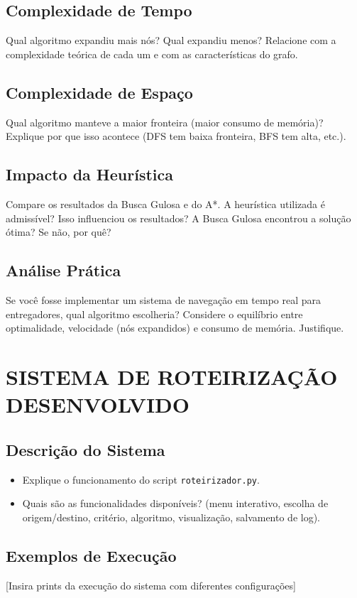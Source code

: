 \documentclass[12pt,a4paper]{article}
\begin{document}
\subsection{Complexidade de Tempo}
Qual algoritmo expandiu mais nós? Qual expandiu menos? Relacione com a complexidade teórica de cada um e com as características do grafo.

\subsection{Complexidade de Espaço}
Qual algoritmo manteve a maior fronteira (maior consumo de memória)? Explique por que isso acontece (DFS tem baixa fronteira, BFS tem alta, etc.).

\subsection{Impacto da Heurística}
Compare os resultados da Busca Gulosa e do A*. A heurística utilizada é admissível? Isso influenciou os resultados? A Busca Gulosa encontrou a solução ótima? Se não, por quê?

\subsection{Análise Prática}
Se você fosse implementar um sistema de navegação em tempo real para entregadores, qual algoritmo escolheria? Considere o equilíbrio entre optimalidade, velocidade (nós expandidos) e consumo de memória. Justifique.

\section{SISTEMA DE ROTEIRIZAÇÃO DESENVOLVIDO}

\subsection{Descrição do Sistema}
\begin{itemize}
    \item Explique o funcionamento do script \texttt{roteirizador.py}.
    \item Quais são as funcionalidades disponíveis? (menu interativo, escolha de origem/destino, critério, algoritmo, visualização, salvamento de log).
\end{itemize}

\subsection{Exemplos de Execução}
[Insira prints da execução do sistema com diferentes configurações]
\end{document}
